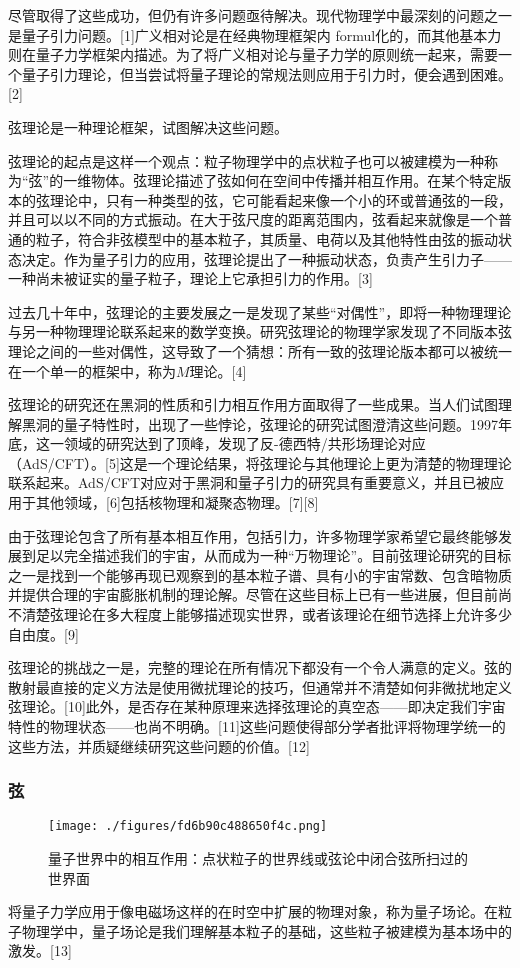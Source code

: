尽管取得了这些成功，但仍有许多问题亟待解决。现代物理学中最深刻的问题之一是量子引力问题。[1]广义相对论是在经典物理框架内 formul化的，而其他基本力则在量子力学框架内描述。为了将广义相对论与量子力学的原则统一起来，需要一个量子引力理论，但当尝试将量子理论的常规法则应用于引力时，便会遇到困难。[2]

弦理论是一种理论框架，试图解决这些问题。

弦理论的起点是这样一个观点：粒子物理学中的点状粒子也可以被建模为一种称为“弦”的一维物体。弦理论描述了弦如何在空间中传播并相互作用。在某个特定版本的弦理论中，只有一种类型的弦，它可能看起来像一个小的环或普通弦的一段，并且可以以不同的方式振动。在大于弦尺度的距离范围内，弦看起来就像是一个普通的粒子，符合非弦模型中的基本粒子，其质量、电荷以及其他特性由弦的振动状态决定。作为量子引力的应用，弦理论提出了一种振动状态，负责产生引力子——一种尚未被证实的量子粒子，理论上它承担引力的作用。[3]

过去几十年中，弦理论的主要发展之一是发现了某些“对偶性”，即将一种物理理论与另一种物理理论联系起来的数学变换。研究弦理论的物理学家发现了不同版本弦理论之间的一些对偶性，这导致了一个猜想：所有一致的弦理论版本都可以被统一在一个单一的框架中，称为\(M\)理论。[4]

弦理论的研究还在黑洞的性质和引力相互作用方面取得了一些成果。当人们试图理解黑洞的量子特性时，出现了一些悖论，弦理论的研究试图澄清这些问题。1997年底，这一领域的研究达到了顶峰，发现了反-德西特/共形场理论对应（AdS/CFT）。[5]这是一个理论结果，将弦理论与其他理论上更为清楚的物理理论联系起来。AdS/CFT对应对于黑洞和量子引力的研究具有重要意义，并且已被应用于其他领域，[6]包括核物理和凝聚态物理。[7][8]

由于弦理论包含了所有基本相互作用，包括引力，许多物理学家希望它最终能够发展到足以完全描述我们的宇宙，从而成为一种“万物理论”。目前弦理论研究的目标之一是找到一个能够再现已观察到的基本粒子谱、具有小的宇宙常数、包含暗物质并提供合理的宇宙膨胀机制的理论解。尽管在这些目标上已有一些进展，但目前尚不清楚弦理论在多大程度上能够描述现实世界，或者该理论在细节选择上允许多少自由度。[9]

弦理论的挑战之一是，完整的理论在所有情况下都没有一个令人满意的定义。弦的散射最直接的定义方法是使用微扰理论的技巧，但通常并不清楚如何非微扰地定义弦理论。[10]此外，是否存在某种原理来选择弦理论的真空态——即决定我们宇宙特性的物理状态——也尚不明确。[11]这些问题使得部分学者批评将物理学统一的这些方法，并质疑继续研究这些问题的价值。[12]
\subsubsection{弦}
\begin{figure}[ht]
\centering
\texttt{[image: ./figures/fd6b90c488650f4c.png]}
\caption{量子世界中的相互作用：点状粒子的世界线或弦论中闭合弦所扫过的世界面} \label{fig_String_2}
\end{figure}
将量子力学应用于像电磁场这样的在时空中扩展的物理对象，称为量子场论。在粒子物理学中，量子场论是我们理解基本粒子的基础，这些粒子被建模为基本场中的激发。[13]

